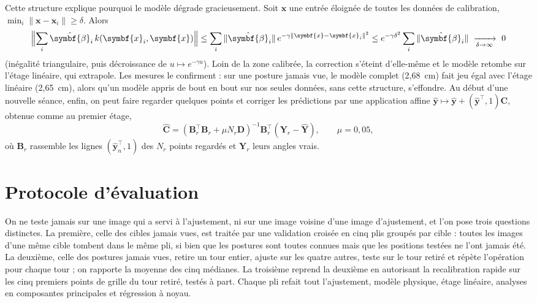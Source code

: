 \documentclass[10pt,a4paper]{article}
\newcommand{\vect}[1]{\symbf{#1}}
\newcommand{\T}{^{\top}}
\begin{document}
Cette structure explique pourquoi le modèle dégrade gracieusement. Soit $\vect x$ une entrée éloignée de toutes les données de calibration, $\min_i\|\vect x-\vect x_i\|\ge\delta$. Alors
\begin{equation}\label{eq:extrapolation}
\Bigl\|\sum_i\hat{\vect\beta}_i\,k(\vect x_i,\vect x)\Bigr\|\le\sum_i\|\hat{\vect\beta}_i\|\,e^{-\gamma\|\vect x-\vect x_i\|^2}\le e^{-\gamma\delta^2}\sum_i\|\hat{\vect\beta}_i\|\ \xrightarrow[\delta\to\infty]{}\ 0
\end{equation}
(inégalité triangulaire, puis décroissance de $u\mapsto e^{-\gamma u}$). Loin de la zone calibrée, la correction s'éteint d'elle-même et le modèle retombe sur l'étage linéaire, qui extrapole. Les mesures le confirment : sur une posture jamais vue, le modèle complet (2,68~cm) fait jeu égal avec l'étage linéaire (2,65~cm), alors qu'un modèle appris de bout en bout sur nos seules données, sans cette structure, s'effondre. Au début d'une nouvelle séance, enfin, on peut faire regarder quelques points et corriger les prédictions par une application affine $\hat{\vect y}\mapsto\hat{\vect y}+(\hat{\vect y}\T,1)\mathbf C$, obtenue comme au premier étage,
\begin{equation}
\hat{\mathbf C}=(\mathbf B_r\T\mathbf B_r+\mu N_r\mathbf D)^{-1}\mathbf B_r\T(\mathbf Y_r-\hat{\mathbf Y}),\qquad\mu=0{,}05 ,
\end{equation}
où $\mathbf B_r$ rassemble les lignes $(\hat{\vect y}_n\T,1)$ des $N_r$ points regardés et $\mathbf Y_r$ leurs angles vrais.

\section{Protocole d'évaluation}\label{sec:eval}

On ne teste jamais sur une image qui a servi à l'ajustement, ni sur une image voisine d'une image d'ajustement, et l'on pose trois questions distinctes. La première, celle des cibles jamais vues, est traitée par une validation croisée en cinq plis groupés par cible : toutes les images d'une même cible tombent dans le même pli, si bien que les postures sont toutes connues mais que les positions testées ne l'ont jamais été. La deuxième, celle des postures jamais vues, retire un tour entier, ajuste sur les quatre autres, teste sur le tour retiré et répète l'opération pour chaque tour ; on rapporte la moyenne des cinq médianes. La troisième reprend la deuxième en autorisant la recalibration rapide sur les cinq premiers points de grille du tour retiré, testés à part. Chaque pli refait tout l'ajustement, modèle physique, étage linéaire, analyses en composantes principales et régression à noyau.
\end{document}
